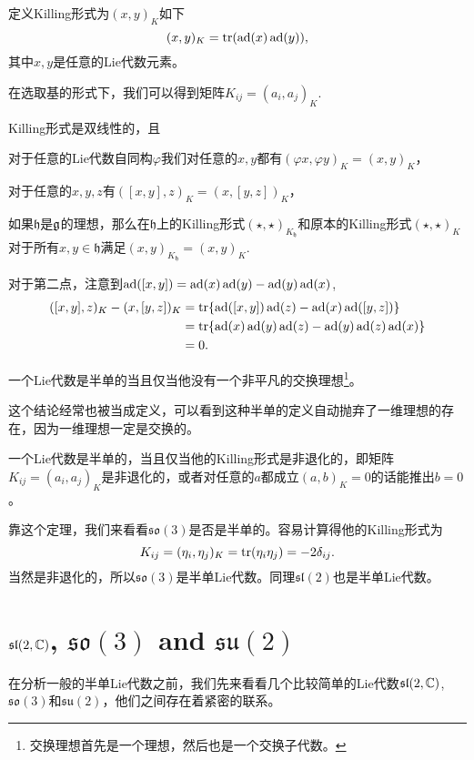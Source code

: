 \para
定义Killing形式为$(x,y)_K$如下
\[
	(x,y)_K=\operatorname{tr}(\operatorname{ad}(x)\operatorname{ad}(y)),
\]
其中$x,y$是任意的Lie代数元素。

在选取基的形式下，我们可以得到矩阵$K_{ij}=(a_i,a_j)_K$.

\begin{theo}
Killing形式是双线性的，且

对于任意的Lie代数自同构$\varphi$我们对任意的$x,y$都有$(\varphi x,\varphi y)_K=(x,y)_K$，

对于任意的$x,y,z$有$([x,y],z)_K=(x,[y,z])_K$，

如果$\mathfrak{h}$是${\mathfrak{g}}$的理想，那么在$\mathfrak{h}$上的Killing形式$(\star,\star)_{K_\mathfrak{h}}$和原本的Killing形式$(\star,\star)_{K}$对于所有$x,y\in \mathfrak{h}$满足$(x,y)_{K_\mathfrak{h}}=(x,y)_K$.
\end{theo}

对于第二点，注意到$\operatorname{ad}([x,y])=\operatorname{ad}(x)\operatorname{ad}(y)-\operatorname{ad}(y)\operatorname{ad}(x)$,
\[
	\begin{split}
		([x,y],z)_K-(x,[y,z])_K&=\operatorname{tr}\{\operatorname{ad}([x,y])\operatorname{ad}(z)-\operatorname{ad}(x)\operatorname{ad}([y,z])\}\\
		&=\operatorname{tr}\{\operatorname{ad}(x)\operatorname{ad}(y)\operatorname{ad}(z)-\operatorname{ad}(y)\operatorname{ad}(z)\operatorname{ad}(x)\}\\
		&=0.
	\end{split}
\]

\begin{theo}
一个Lie代数是半单的当且仅当他没有一个非平凡的交换理想\footnote{交换理想首先是一个理想，然后也是一个交换子代数。}。
\end{theo}
这个结论经常也被当成定义，可以看到这种半单的定义自动抛弃了一维理想的存在，因为一维理想一定是交换的。

\begin{theo}
一个Lie代数是半单的，当且仅当他的Killing形式是非退化的，即矩阵$K_{ij}=(a_i,a_j)_K$是非退化的，或者对任意的$a$都成立$(a,b)_K=0$的话能推出$b=0$。
\end{theo}

靠这个定理，我们来看看$\mathfrak{so}(3)$是否是半单的。容易计算得他的Killing形式为
\[
	K_{ij}=(\eta_i,\eta_j)_K=\operatorname{tr}(\eta_i\eta_j)=-2\delta_{ij}.
\]
当然是非退化的，所以$\mathfrak{so}(3)$是半单Lie代数。同理$\mathfrak{sl}(2)$也是半单Lie代数。

\section{$\mathfrak{sl}(2,\mathbb{C})$, $\mathfrak{so}(3)$ and $\mathfrak{su}(2)$}
在分析一般的半单Lie代数之前，我们先来看看几个比较简单的Lie代数$\mathfrak{sl}(2,\mathbb{C})$, $\mathfrak{so}(3)$和$\mathfrak{su}(2)$，他们之间存在着紧密的联系。

